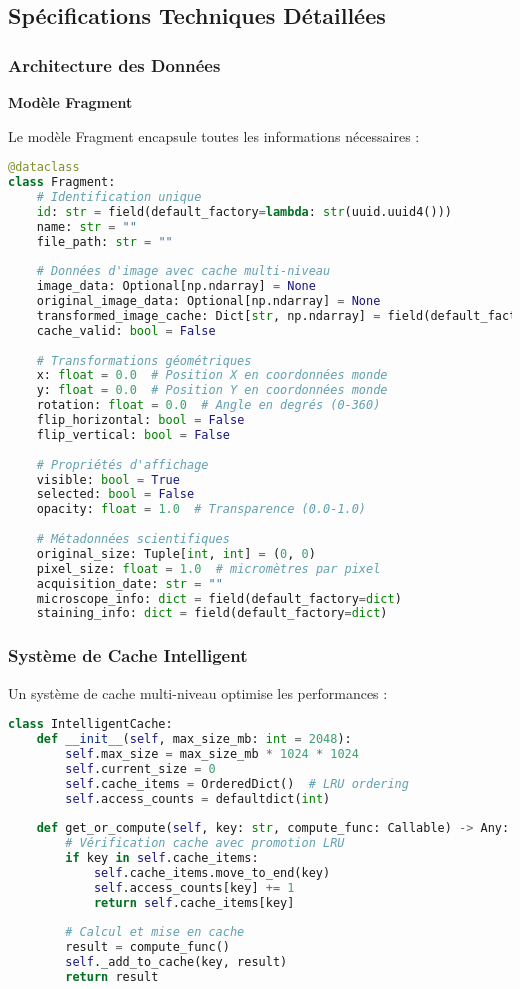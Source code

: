 \documentclass[12pt,a4paper]{report}
\begin{document}
\subsection{Spécifications Techniques Détaillées}

\subsubsection{Architecture des Données}

\textbf{Modèle Fragment}

Le modèle Fragment encapsule toutes les informations nécessaires :

\begin{lstlisting}[language=Python]
@dataclass
class Fragment:
    # Identification unique
    id: str = field(default_factory=lambda: str(uuid.uuid4()))
    name: str = ""
    file_path: str = ""
    
    # Données d'image avec cache multi-niveau
    image_data: Optional[np.ndarray] = None
    original_image_data: Optional[np.ndarray] = None
    transformed_image_cache: Dict[str, np.ndarray] = field(default_factory=dict)
    cache_valid: bool = False
    
    # Transformations géométriques
    x: float = 0.0  # Position X en coordonnées monde
    y: float = 0.0  # Position Y en coordonnées monde
    rotation: float = 0.0  # Angle en degrés (0-360)
    flip_horizontal: bool = False
    flip_vertical: bool = False
    
    # Propriétés d'affichage
    visible: bool = True
    selected: bool = False
    opacity: float = 1.0  # Transparence (0.0-1.0)
    
    # Métadonnées scientifiques
    original_size: Tuple[int, int] = (0, 0)
    pixel_size: float = 1.0  # micromètres par pixel
    acquisition_date: str = ""
    microscope_info: dict = field(default_factory=dict)
    staining_info: dict = field(default_factory=dict)
\end{lstlisting}

\subsubsection{Système de Cache Intelligent}

Un système de cache multi-niveau optimise les performances :

\begin{lstlisting}[language=Python]
class IntelligentCache:
    def __init__(self, max_size_mb: int = 2048):
        self.max_size = max_size_mb * 1024 * 1024
        self.current_size = 0
        self.cache_items = OrderedDict()  # LRU ordering
        self.access_counts = defaultdict(int)
        
    def get_or_compute(self, key: str, compute_func: Callable) -> Any:
        # Vérification cache avec promotion LRU
        if key in self.cache_items:
            self.cache_items.move_to_end(key)
            self.access_counts[key] += 1
            return self.cache_items[key]
        
        # Calcul et mise en cache
        result = compute_func()
        self._add_to_cache(key, result)
        return result
\end{lstlisting}
\end{document}
